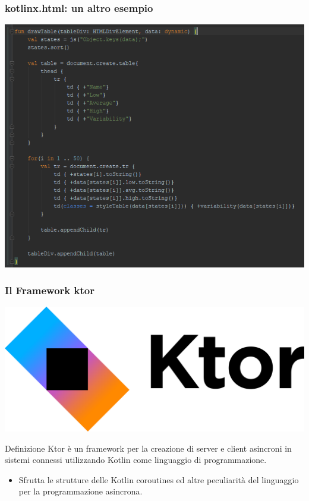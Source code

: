    \begin{frame}
      \frametitle{\textbf{kotlinx.html}: un altro esempio}
      \begin{center}
        \includegraphics[scale=0.5]{HtmlXCreateTable}
      \end{center}
    \end{frame}
    \begin{frame}
      \frametitle{Il Framework \textbf{ktor}}
      \includegraphics[scale=0.2]{Ktor}
      \begin{block}{Definizione}
        Ktor è un framework per la creazione di server e client asincroni in sistemi connessi utilizzando Kotlin come linguaggio di programmazione.
      \end{block}
      \begin{itemize}
        \item Sfrutta le strutture delle \alert{Kotlin coroutines} ed altre peculiarità del linguaggio per la programmazione asincrona.
      \end{itemize}
    \end{frame}


